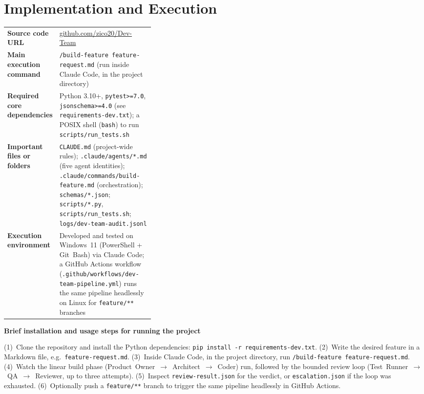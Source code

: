 \documentclass[11pt,a4paper]{article}
\newcommand{\answerarea}[2]{\textbf{#1}\par\begin{answerbox}#2\end{answerbox}}
\begin{document}
\section{Implementation and Execution}

\begin{tabularx}{\linewidth}{@{}L{0.35\linewidth}Y@{}}
\textbf{Source code URL} & \href{https://github.com/zico20/Dev-Team}{github.com/zico20/Dev-Team} \\
\textbf{Main execution command} & \texttt{/build-feature feature-request.md} (run inside Claude Code, in the project directory) \\
\textbf{Required core dependencies} & Python 3.10+, \texttt{pytest>=7.0}, \texttt{jsonschema>=4.0} (see \texttt{requirements-dev.txt}); a POSIX shell (\texttt{bash}) to run \texttt{scripts/run\_tests.sh} \\
\textbf{Important files or folders} & \texttt{CLAUDE.md} (project-wide rules); \texttt{.claude/agents/*.md} (five agent identities); \texttt{.claude/commands/build-feature.md} (orchestration); \texttt{schemas/*.json}; \texttt{scripts/*.py}, \texttt{scripts/run\_tests.sh}; \texttt{logs/dev-team-audit.jsonl} \\
\textbf{Execution environment} & Developed and tested on Windows~11 (PowerShell + Git~Bash) via Claude Code; a GitHub Actions workflow (\texttt{.github/workflows/dev-team-pipeline.yml}) runs the same pipeline headlessly on Linux for \texttt{feature/**} branches \\
\end{tabularx}

\answerarea{Brief installation and usage steps for running the project}{
(1)~Clone the repository and install the Python dependencies:
\texttt{pip install -r requirements-dev.txt}. (2)~Write the desired feature in a Markdown
file, e.g.\ \texttt{feature-request.md}. (3)~Inside Claude Code, in the project directory,
run \texttt{/build-feature feature-request.md}. (4)~Watch the linear build phase
(Product~Owner~$\rightarrow$~Architect~$\rightarrow$~Coder) run, followed by the bounded
review loop (Test~Runner~$\rightarrow$~QA~$\rightarrow$~Reviewer, up to three attempts).
(5)~Inspect \texttt{review-result.json} for the verdict, or \texttt{escalation.json} if the
loop was exhausted. (6)~Optionally push a \texttt{feature/**} branch to trigger the same
pipeline headlessly in GitHub Actions.
}
\end{document}
